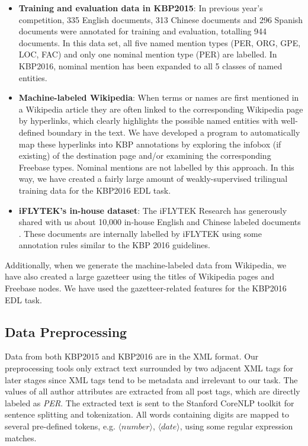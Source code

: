 \documentclass[11pt,a4paper]{article}
\begin{document}
\begin{itemize}
	\item \textbf{Training and evaluation data in KBP2015}: In previous year's competition, 335 English documents, 313 Chinese documents and 296 Spanish documents were annotated for training and evaluation, totalling 944 documents. In this data set, all five named mention types (PER, ORG, GPE, LOC, FAC) and only one nominal mention type (PER) are labelled. In KBP2016, nominal mention has been expanded to all 5 classes of named entities.
	
	\item \textbf{Machine-labeled Wikipedia}: When terms or names are first mentioned in a Wikipedia article they are often linked to the corresponding Wikipedia page by hyperlinks, which clearly highlights the possible named entities with well-defined boundary in the text. We have developed a program to automatically map these hyperlinks into KBP annotations by exploring the infobox (if existing) of the destination page and/or examining the corresponding Freebase types. Nominal mentions are not labelled by this approach. In this way, we have created a fairly large amount of  weakly-supervised trilingual training data for the KBP2016 EDL task.
	
	\item \textbf{iFLYTEK's in-house dataset}: The iFLYTEK Research has generously shared with us about 10,000 in-house English and Chinese labeled documents \cite{kbp2016iflytek}.  These documents are internally labelled by iFLYTEK using some annotation rules similar to the KBP 2016 guidelines.
	
\end{itemize}

Additionally, when we generate the machine-labeled data from Wikipedia, we have also created a large gazetteer using the titles of Wikipedia pages and Freebase nodes. 
We have used the gazetteer-related features for the KBP2016 EDL task.

\subsection{Data Preprocessing}

Data from both KBP2015 and KBP2016 are in the  XML format. 
Our preprocessing tools only extract text surrounded by two adjacent XML tags for later stages 
since XML tags tend to be metadata and irrelevant to our task. 
The values of all author attributes are extracted from all post tags, which are directly labeled as {\it PER}.
The extracted text is sent to the Stanford CoreNLP toolkit for sentence splitting and tokenization.  
All words containing digits are mapped to several pre-defined tokens, e.g. $\langle number \rangle$, $\langle date \rangle$, using some regular expression matches.   
\end{document}
